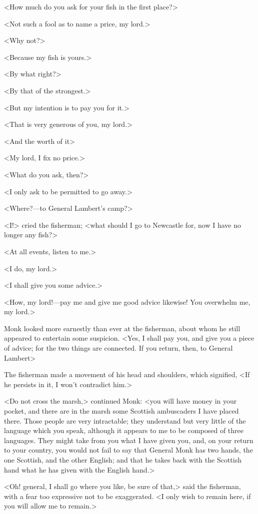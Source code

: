 <How much do you ask for your fish in the first place?>

<Not such a fool as to name a price, my lord.>

<Why not?>

<Because my fish is yours.>

<By what right?>

<By that of the strongest.>

<But my intention is to pay you for it.>

<That is very generous of you, my lord.>

<And the worth of it\longdash>

<My lord, I fix no price.>

<What do you ask, then?>

<I only ask to be permitted to go away.>

<Where?—to General Lambert's camp?>

<I\@!> cried the fisherman; <what should I go to Newcastle for, now I have no longer any fish?>

<At all events, listen to me.>

<I do, my lord.>

<I shall give you some advice.>

<How, my lord!—pay me and give me good advice likewise! You overwhelm me, my lord.>

Monk looked more earnestly than ever at the fisherman, about whom he still appeared to entertain some suspicion. <Yes, I shall pay you, and give you a piece of advice; for the two things are connected. If you return, then, to General Lambert\longdash>

The fisherman made a movement of his head and shoulders, which signified, <If he persists in it, I won't contradict him.>

<Do not cross the marsh,> continued Monk: <you will have money in your pocket, and there are in the marsh some Scottish ambuscaders I have placed there. Those people are very intractable; they understand but very little of the language which you speak, although it appears to me to be composed of three languages. They might take from you what I have given you, and, on your return to your country, you would not fail to say that General Monk has two hands, the one Scottish, and the other English; and that he takes back with the Scottish hand what he has given with the English hand.>

<Oh! general, I shall go where you like, be sure of that,> said the fisherman, with a fear too expressive not to be exaggerated. <I only wish to remain here, if you will allow me to remain.>

